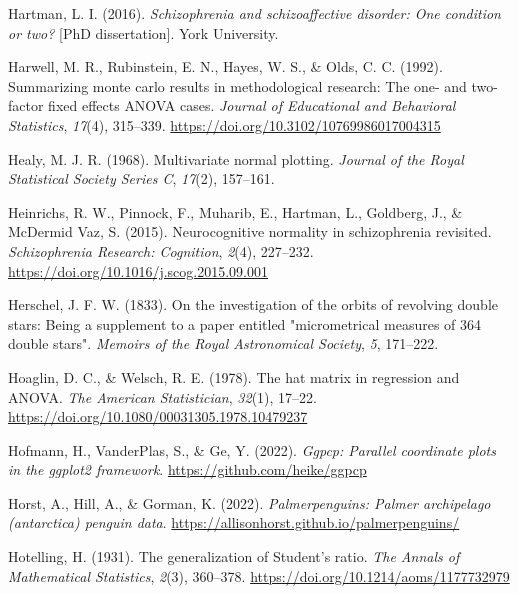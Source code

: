 \documentclass[
  letterpaper,
  10pt,
  krantz2]{krantz}
\newlength{\cslhangindent}
\newlength{\cslentryspacingunit} %
\newenvironment{CSLReferences}[2] %
 {%
  \setlength{\parindent}{0pt}
  \ifodd #1
  \let\oldpar\par
  \def\par{\hangindent=\cslhangindent\oldpar}
  \fi
  \setlength{\parskip}{#2\cslentryspacingunit}
 }%
 {}
\begin{document}
\begin{CSLReferences}{1}{0}
\leavevmode{}%
Hartman, L. I. (2016). \emph{Schizophrenia and schizoaffective disorder:
One condition or two?} {[}PhD dissertation{]}. York University.

\leavevmode{}%
Harwell, M. R., Rubinstein, E. N., Hayes, W. S., \& Olds, C. C. (1992).
Summarizing monte carlo results in methodological research: The one- and
two-factor fixed effects {ANOVA} cases. \emph{Journal of Educational and
Behavioral Statistics}, \emph{17}(4), 315--339.
\url{https://doi.org/10.3102/10769986017004315}

\leavevmode{}%
Healy, M. J. R. (1968). Multivariate normal plotting. \emph{Journal of
the Royal Statistical Society Series C}, \emph{17}(2), 157--161.

\leavevmode{}%
Heinrichs, R. W., Pinnock, F., Muharib, E., Hartman, L., Goldberg, J.,
\& McDermid Vaz, S. (2015). Neurocognitive normality in schizophrenia
revisited. \emph{Schizophrenia Research: Cognition}, \emph{2}(4),
227--232. \url{https://doi.org/10.1016/j.scog.2015.09.001}

\leavevmode{}%
Herschel, J. F. W. (1833). On the investigation of the orbits of
revolving double stars: Being a supplement to a paper entitled
"micrometrical measures of 364 double stars". \emph{Memoirs of the Royal
Astronomical Society}, \emph{5}, 171--222.

\leavevmode{}%
Hoaglin, D. C., \& Welsch, R. E. (1978). The hat matrix in regression
and {ANOVA}. \emph{The American Statistician}, \emph{32}(1), 17--22.
\url{https://doi.org/10.1080/00031305.1978.10479237}

\leavevmode{}%
Hofmann, H., VanderPlas, S., \& Ge, Y. (2022). \emph{Ggpcp: Parallel
coordinate plots in the ggplot2 framework}.
\url{https://github.com/heike/ggpcp}

\leavevmode{}%
Horst, A., Hill, A., \& Gorman, K. (2022). \emph{Palmerpenguins: Palmer
archipelago (antarctica) penguin data}.
\url{https://allisonhorst.github.io/palmerpenguins/}

\leavevmode{}%
Hotelling, H. (1931). The generalization of {Student's} ratio. \emph{The
Annals of Mathematical Statistics}, \emph{2}(3), 360--378.
\url{https://doi.org/10.1214/aoms/1177732979}


\end{CSLReferences}
\end{document}

